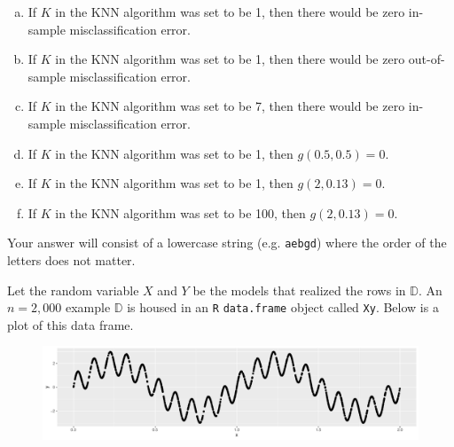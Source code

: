 \documentclass[12pt,landscape]{article}
\newcommand{\instr}{\small Your answer will consist of a lowercase string (e.g. \texttt{aebgd}) where the order of the letters does not matter. \normalsize}
\begin{document}
\benum{}

\begin{enumerate}[(a)]
\item If $K$ in the KNN algorithm was set to be 1, then there would be zero in-sample misclassification error.
\item If $K$ in the KNN algorithm was set to be 1, then there would be zero out-of-sample misclassification error.
\item If $K$ in the KNN algorithm was set to be 7, then there would be zero in-sample misclassification error.
\item If $K$ in the KNN algorithm was set to be 1, then $g(0.5, 0.5) = 0$.
\item If $K$ in the KNN algorithm was set to be 1, then $g(2, 0.13) = 0$.
\item If $K$ in the KNN algorithm was set to be 100, then $g(2, 0.13) = 0$.
\end{enumerate}
\eenum\instr\pagebreak


\problem{} Let the random variable $X$ and $Y$ be the models that realized the rows in $\mathbb{D}$. An $n=2,000$ example $\mathbb{D}$ is housed in an \texttt{R} \texttt{data.frame} object called \texttt{Xy}. Below is a plot of this data frame.

\begin{figure}[htp]
\centering
\includegraphics[width = 9in]{sine.pdf}\vspace{-0.4cm}
\end{figure}

\benum{}
\end{document}

